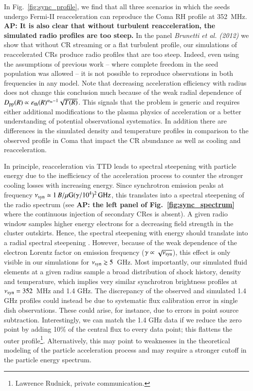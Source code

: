 \documentclass[fleqn,usenatbib,useAMS]{mnras}
\newcommand{\eps}{\varepsilon}
\def\AP2#1{{\bf  AP2: #1}}
\def\AP#1{{\bf {\color{blue} AP: #1}}}
\begin{document}
In Fig.~\ref{fig:sync_profile}, we find that all three scenarios in
which the seeds undergo Fermi-II reacceleration can reproduce the Coma
RH profile at 352~MHz. \AP{It is also clear that without turbulent
  reacceleration, the simulated radio profiles are too steep.} In the
panel {\it Brunetti et al. (2012)} we show that without CR streaming
or a flat turbulent profile, our simulations of reaccelerated CRs
produce radio profiles that are too steep. Indeed, even using the
assumptions of previous work -- where complete freedom in the seed
population was allowed -- it is not possible to reproduce observations
in both frequencies in any model. Note that decreasing acceleration
efficiency with radius does not change this conclusion much because of
the weak radial dependence of $D_\rmn{pp}(R)\propto
\eps_\rmn{th}(R)^{\alpha_\rmn{tu}-1}\sqrt{T(R)}$. This signals that
the problem is generic and requires either additional modifications to
the plasma physics of acceleration or a better understanding of
potential observational systematics. In addition there are differences
in the simulated density and temperature profiles in comparison to the
observed profile in Coma that impact the CR abundance as well as
cooling and reacceleration.

In principle, reacceleration via TTD leads to spectral steepening with
particle energy due to the inefficiency of the acceleration process to
counter the stronger cooling losses with increasing energy. Since
synchrotron emission peaks at frequency $\nu_{\mathrm{syn}}\simeq 1\,
B/\mu{\mathrm{G}} (\gamma/10^4)^2\,{\mathrm{GHz}}$, this translates into a
spectral steepening of the radio spectrum (see \AP{the left panel of
  Fig.~\ref{fig:sync_spectrum}} where the continuous injection of
secondary CRes is absent). A given radio window samples higher energy
electrons for a decreasing field strength in the cluster
outskirts. Hence, the spectral steepening with energy should translate
into a radial spectral steepening \citep{brunetti12}. However, because
of the weak dependence of the electron Lorentz factor on emission
frequency ($\gamma\propto\sqrt{\nu_{\mathrm{syn}}}$), this effect is only
visible in our simulations for $\nu_{\mathrm{syn}}\gtrsim5$~GHz. Most
importantly, our simulated fluid elements at a given radius sample a
broad distribution of shock history, density and temperature, which
implies very similar synchrotron brightness profiles at
$\nu_{\mathrm{syn}}=352$~MHz and 1.4 GHz. The discrepancy of the observed
and simulated 1.4 GHz profiles could instead be due to systematic flux
calibration error in single dish observations. These could arise, for
instance, due to errors in point source subtraction. Interestingly, we
can match the 1.4 GHz data if we reduce the zero point by adding 10\%
of the central flux to every data point; this flattens the outer
profile\footnote{Lawrence Rudnick, private communication.}.
Alternatively, this may point to weaknesses in the theoretical
modeling of the particle acceleration process and may require a
stronger cutoff in the particle energy spectrum.
\end{document}
